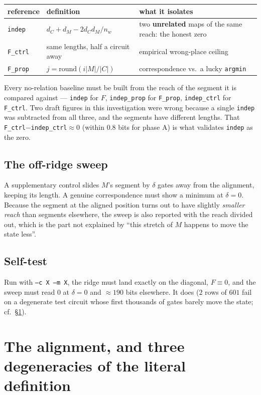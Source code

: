 \documentclass[11pt]{article}
\newcommand{\code}[1]{\texttt{#1}}
\begin{document}
\begin{center}\small
\begin{tabular}{@{}lll@{}}
\toprule
reference & definition & what it isolates \\
\midrule
\code{indep} & $d_C + d_M - 2 d_C d_M / n_w$ & two \textbf{unrelated} maps of the same reach: the honest zero \\
\code{F\_ctrl} & same lengths, half a circuit away & empirical wrong-place ceiling \\
\code{F\_prop} & $j=\mathrm{round}(i|M|/|C|)$ & correspondence vs.\ a lucky \code{argmin} \\
\bottomrule
\end{tabular}
\end{center}

Every no-relation baseline must be built from the reach of the segment it is compared against ---
\code{indep} for $F$, \code{indep\_prop} for \code{F\_prop}, \code{indep\_ctrl} for \code{F\_ctrl}. Two
draft figures in this investigation were wrong because a single \code{indep} was subtracted from all
three, and the segments have different lengths. That \code{F\_ctrl}$-$\code{indep\_ctrl}$\approx 0$
(within $0.8$ bits for phase A) is what validates \code{indep} as the zero.

\subsection{The off-ridge sweep}
A supplementary control slides $M$'s segment by $\delta$ gates away from the alignment, keeping its
length. A genuine correspondence must show a minimum at $\delta=0$. Because the segment at the aligned
position turns out to have slightly \emph{smaller reach} than segments elsewhere, the sweep is also
reported with the reach divided out, which is the part not explained by ``this stretch of $M$ happens to
move the state less''.

\subsection{Self-test}
Run with \code{--c X --m X}, the ridge must land exactly on the diagonal, $F\equiv0$, and the sweep must
read $0$ at $\delta=0$ and $\approx190$ bits elsewhere. It does ($2$ rows of $601$ fail on a degenerate
test circuit whose first thousands of gates barely move the state; cf.\ §\ref{sec:degen}).

\section{The alignment, and three degeneracies of the literal definition}\label{sec:degen}
\end{document}
